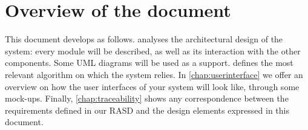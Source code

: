 \section{Overview of the document}	
This document develops as follows.  analyses the architectural design of the system: every module will be described, as well as its interaction with the other components. Some UML diagrams will be used as a support.  defines the most relevant algorithm on which the system relies. In \cref{chap:userinterface} we offer an overview on how the user interfaces of your system will look like, through some mock-ups. Finally, \cref{chap:traceability} shows any correspondence between the requirements defined in our RASD and the design elements expressed in this document.

